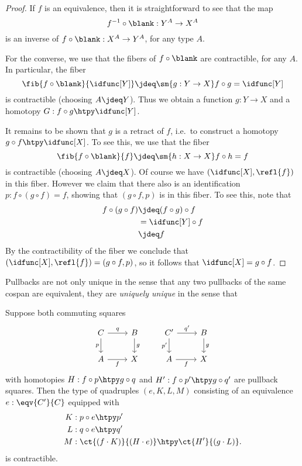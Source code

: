 \begin{proof}
If $f$ is an equivalence, then it is straightforward to see that the map
\begin{equation*}
f^{-1}\circ\blank : Y^A\to X^A
\end{equation*}
is an inverse of $f\circ \blank : X^A \to Y^A$, for any type $A$.

For the converse, we use that the fibers of $f\circ \blank$ are contractible, for any $A$. In particular, the fiber
\begin{equation*}
\fib{f\circ\blank}{\idfunc[Y]}\jdeq \sm{g:Y\to X} f\circ g=\idfunc[Y]
\end{equation*}
is contractible (choosing $A\jdeq Y$). Thus we obtain a function $g:Y\to X$ and a homotopy $G:f\circ g\htpy \idfunc[Y]$.

It remains to be shown that $g$ is a retract of $f$, i.e.~to construct a homotopy $g\circ f\htpy \idfunc[X]$. To see this, we use that the fiber
\begin{equation*}
\fib{f\circ\blank}{f}\jdeq \sm{h:X\to X} f\circ h=f
\end{equation*}
is contractible (choosing $A\jdeq X$). Of course we have $(\idfunc[X],\refl{f})$ in this fiber. However we claim that there also is an identification $p:f\circ (g\circ f)=f$, showing that $(g\circ f,p)$ is in this fiber. To see this, note that
\begin{align*}
f\circ (g\circ f) & \jdeq (f\circ g)\circ f \\
& = \idfunc[Y]\circ f \\
& \jdeq f
\end{align*}
By the contractibility of the fiber we conclude that $(\idfunc[X],\refl{f})=(g\circ f,p)$, so it follows that $\idfunc[X]=g\circ f$.
\end{proof}

Pullbacks are not only unique in the sense that any two pullbacks of the same cospan are equivalent, they are \emph{uniquely unique} in the sense that 

\begin{cor}
Suppose both commuting squares
\begin{equation*}
\begin{tikzcd}
C \arrow[r,"q"] \arrow[d,swap,"p"] & B \arrow[d,"g"] & {C'} \arrow[r,"{q'}"] \arrow[d,swap,"{p'}"] & B \arrow[d,"g"] \\
A \arrow[r,swap,"f"] & X & A \arrow[r,swap,"f"] & X
\end{tikzcd}
\end{equation*}
with homotopies $H:f\circ p \htpy g\circ q$ and $H':f\circ p'\htpy g\circ q'$ are pullback squares.
Then the type of quadruples $(e,K,L,M)$ consisting of an equivalence $e:\eqv{C'}{C}$ equipped with
\begin{align*}
K & : p\circ e \htpy p' \\
L & : q\circ e \htpy q' \\
M & : \ct{(f\cdot K)}{(H\cdot e)} \htpy \ct{H'}{(g\cdot L)}.
\end{align*}
is contractible.
\end{cor}

